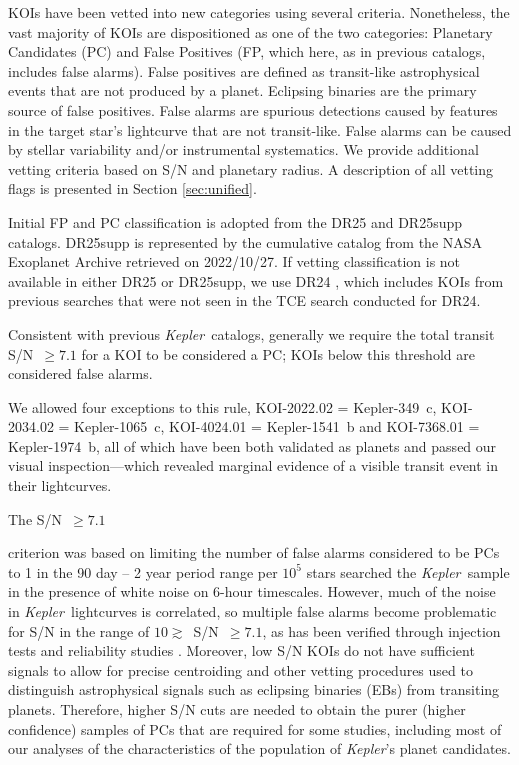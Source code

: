 \documentclass{aastex62}
\newcommand{\ikt}{{\it Kepler}}
\newcommand{\ik}{{\it Kepler~}}
\begin{document}
KOIs have been vetted into new categories using several criteria.  Nonetheless, the vast majority of KOIs are dispositioned as one of the two categories: Planetary Candidates (PC) and False Positives (FP, which here, as in previous catalogs, includes false alarms).  False positives are defined as transit-like astrophysical events that are not produced by a planet.  Eclipsing binaries are the primary source of false positives.  False alarms are spurious detections caused by features in the target star’s lightcurve that are not transit-like.  False alarms can be caused by stellar variability and/or instrumental systematics.  We provide additional vetting criteria based on S/N and planetary radius. A description of all vetting flags is presented in Section \ref{sec:unified}. 

Initial FP and PC classification is adopted from the DR25 and DR25supp catalogs. DR25supp is represented by the cumulative catalog from the NASA Exoplanet Archive retrieved on {2022/10/27}. If vetting classification is not available in either DR25 or DR25supp, we use DR24 \citep{Coughlin:2016}, which includes KOIs from previous searches that were not seen in the TCE search conducted for DR24.

Consistent with previous \ik catalogs, generally we require the total transit S/N~$\geq 7.1$ for a KOI to be considered a PC; KOIs below this threshold are considered false alarms. {We allowed four exceptions to this rule, KOI-2022.02 = Kepler-349~c, KOI-2034.02 = Kepler-1065~c, KOI-4024.01 = Kepler-1541~b and KOI-7368.01 = Kepler-1974~b, all of which have been both validated as planets and passed our visual inspection---which revealed marginal evidence of a visible transit event in their lightcurves.

The  S/N~$\geq 7.1$ } criterion was based on limiting the number of false alarms considered to be PCs to 1 in the 90 day -- 2 year period range per $10^5$ stars searched the \ik sample in the presence of white noise on 6-hour timescales.  However, much of the noise in \ik lightcurves is correlated, so multiple false alarms become problematic for S/N in the range of $10 \gtrsim$~S/N~$\geq 7.1$, as has been verified through injection tests and reliability studies \citep{Thompson:2018,Hsu:2019}.  Moreover, low S/N KOIs do not have sufficient signals to allow for precise centroiding and other vetting procedures used to distinguish astrophysical signals such as eclipsing binaries (EBs) from transiting planets.  Therefore, higher S/N cuts are needed to obtain the purer (higher confidence) samples of PCs that are required for some studies, including most of our analyses of the characteristics of the population of \ikt's planet candidates. 
\end{document}

